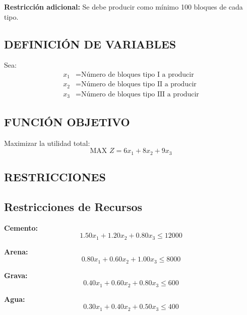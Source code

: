 \documentclass[12pt, a4paper, oneside]{book}
\theoremstyle{definition}
\begin{document}
    \textbf{Restricción adicional:} Se debe producir como mínimo 100 bloques de cada tipo.

    \subsection{DEFINICIÓN DE VARIABLES}

    Sea:
    \begin{align}
    x_1 &= \text{Número de bloques tipo I a producir} \\
    x_2 &= \text{Número de bloques tipo II a producir} \\
    x_3 &= \text{Número de bloques tipo III a producir}
    \end{align}

    \subsection{FUNCIÓN OBJETIVO}

    Maximizar la utilidad total:
    \begin{equation}
    \text{MAX } Z = 6x_1 + 8x_2 + 9x_3
    \end{equation}

    \subsection{RESTRICCIONES}

    \subsection{Restricciones de Recursos}

    \textbf{Cemento:}
    \begin{equation}
    1.50x_1 + 1.20x_2 + 0.80x_3 \leq 12000
    \end{equation}

    \textbf{Arena:}
    \begin{equation}
    0.80x_1 + 0.60x_2 + 1.00x_3 \leq 8000
    \end{equation}

    \textbf{Grava:}
    \begin{equation}
    0.40x_1 + 0.60x_2 + 0.80x_3 \leq 600
    \end{equation}

    \textbf{Agua:}
    \begin{equation}
    0.30x_1 + 0.40x_2 + 0.50x_3 \leq 400
    \end{equation}
\end{document}
